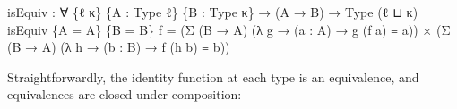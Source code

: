 \documentclass[
  11pt,
  oneside,
  article]{memoir}
\newenvironment{Shaded}{}{}
\newcommand{\NormalTok}[1]{#1}
\newcommand{\OtherTok}[1]{\textcolor[rgb]{0.00,0.44,0.13}{#1}}
\theoremstyle{definition}
\theoremstyle{plain}
\newcommand{\0}{\textsf{0}}
\newcommand{\1}{\tn{\textsf{1}}}
\begin{document}
\begin{Shaded}
\begin{Highlighting}[]
\NormalTok{isEquiv }\OtherTok{:} \OtherTok{∀} \OtherTok{\{}\NormalTok{ℓ κ}\OtherTok{\}} \OtherTok{\{}\NormalTok{A }\OtherTok{:}\NormalTok{ Type ℓ}\OtherTok{\}} \OtherTok{\{}\NormalTok{B }\OtherTok{:}\NormalTok{ Type κ}\OtherTok{\}} \OtherTok{→} \OtherTok{(}\NormalTok{A }\OtherTok{→}\NormalTok{ B}\OtherTok{)} \OtherTok{→}\NormalTok{ Type }\OtherTok{(}\NormalTok{ℓ ⊔ κ}\OtherTok{)}
\NormalTok{isEquiv }\OtherTok{\{}\NormalTok{A }\OtherTok{=}\NormalTok{ A}\OtherTok{\}} \OtherTok{\{}\NormalTok{B }\OtherTok{=}\NormalTok{ B}\OtherTok{\}}\NormalTok{ f }\OtherTok{=} 
      \OtherTok{(}\NormalTok{Σ }\OtherTok{(}\NormalTok{B }\OtherTok{→}\NormalTok{ A}\OtherTok{)} \OtherTok{(λ}\NormalTok{ g }\OtherTok{→} \OtherTok{(}\NormalTok{a }\OtherTok{:}\NormalTok{ A}\OtherTok{)} \OtherTok{→}\NormalTok{ g }\OtherTok{(}\NormalTok{f a}\OtherTok{)}\NormalTok{ ≡ a}\OtherTok{))} 
\NormalTok{    × }\OtherTok{(}\NormalTok{Σ }\OtherTok{(}\NormalTok{B }\OtherTok{→}\NormalTok{ A}\OtherTok{)} \OtherTok{(λ}\NormalTok{ h }\OtherTok{→} \OtherTok{(}\NormalTok{b }\OtherTok{:}\NormalTok{ B}\OtherTok{)} \OtherTok{→}\NormalTok{ f }\OtherTok{(}\NormalTok{h b}\OtherTok{)}\NormalTok{ ≡ b}\OtherTok{))}
\end{Highlighting}
\end{Shaded}

Straightforwardly, the identity function at each type is an equivalence,
and equivalences are closed under composition:
\end{document}
